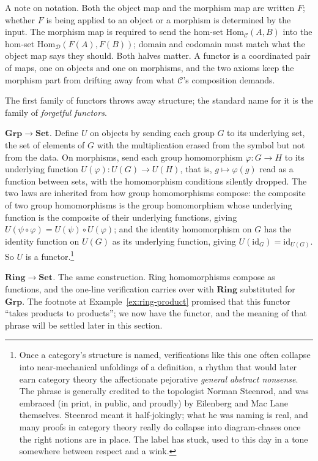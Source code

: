 \noindent A note on notation. Both the object map and the
morphism map are written $F$; whether $F$ is being applied to an
object or a morphism is determined by the input. The morphism map
is required to send the hom-set $\mathrm{Hom}_{\mathcal{C}}(A,B)$
into the hom-set $\mathrm{Hom}_{\mathcal{D}}(F(A), F(B))$; domain
and codomain must match what the object map says they should. Both halves matter. A
functor is a coordinated pair of maps, one on objects and one on
morphisms, and the two axioms keep the morphism part from
drifting away from what $\mathcal{C}$'s composition demands.

\begin{example}\label{ex:forgetful}
The first family of functors throws away structure; the standard
name for it is the family of \textit{forgetful
functors}.

\textit{$\mathbf{Grp} \to \mathbf{Set}$.} Define $U$ on objects
by sending each group $G$ to its underlying set, the set of
elements of $G$ with the multiplication erased from the symbol
but not from the data. On morphisms, send each group
homomorphism $\varphi : G \to H$ to its underlying function
$U(\varphi) : U(G) \to U(H)$, that is, $g \mapsto \varphi(g)$
read as a function between sets, with the homomorphism conditions
silently dropped. The two laws are inherited from how group
homomorphisms compose: the composite of two group homomorphisms
is the group homomorphism whose underlying function is the
composite of their underlying functions, giving $U(\psi \circ
\varphi) = U(\psi) \circ U(\varphi)$; and the identity
homomorphism on $G$ has the identity function on $U(G)$ as its
underlying function, giving $U(\mathrm{id}_G) =
\mathrm{id}_{U(G)}$. So $U$ is a functor.\footnote{Once a
category's structure is named, verifications like this one often
collapse into near-mechanical unfoldings of a definition, a
rhythm that would later earn category theory the affectionate
pejorative \textit{general abstract nonsense}. The phrase is
generally credited to the topologist Norman Steenrod, and was
embraced (in print, in public, and proudly) by Eilenberg and
Mac Lane themselves.
Steenrod meant it half-jokingly; what he was naming is real, and
many proofs in category theory really do collapse into
diagram-chases once the right notions are in place. The label has
stuck, used to this day in a tone somewhere between respect and
a wink.}

\textit{$\mathbf{Ring} \to \mathbf{Set}$.} The same construction.
Ring homomorphisms compose as functions, and the one-line
verification carries over with $\mathbf{Ring}$ substituted for
$\mathbf{Grp}$. The footnote at Example~\ref{ex:ring-product}
promised that this functor ``takes products to products''; we
now have the functor, and the meaning of that phrase will be
settled later in this section.


\end{example}
